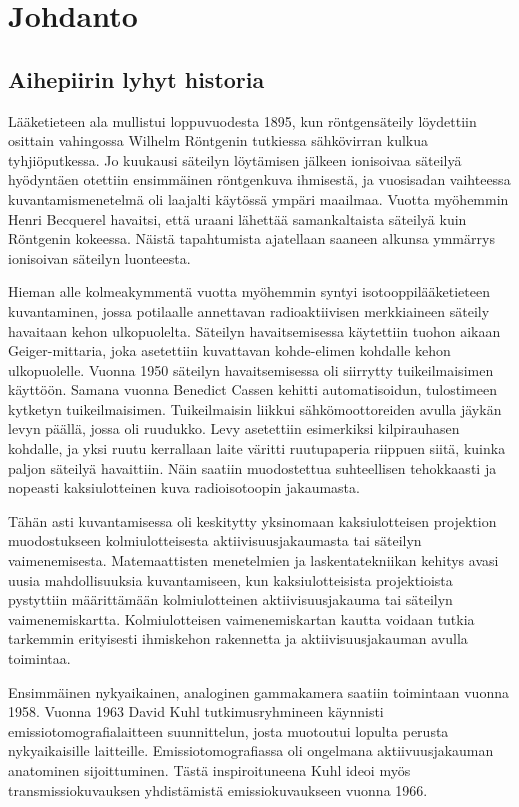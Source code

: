 \section{Johdanto}
\subsection{Aihepiirin lyhyt historia}
Lääketieteen ala mullistui loppuvuodesta 1895, kun röntgensäteily löydettiin osittain vahingossa Wilhelm Röntgenin tutkiessa sähkövirran kulkua tyhjiöputkessa. Jo kuukausi säteilyn löytämisen jälkeen ionisoivaa säteilyä hyödyntäen otettiin ensimmäinen röntgenkuva ihmisestä, ja vuosisadan vaihteessa kuvantamismenetelmä oli laajalti käytössä ympäri maailmaa.\cite{bercovich_medical_2018, cherry_basic_2012} Vuotta myöhemmin Henri Becquerel havaitsi, että uraani lähettää samankaltaista säteilyä kuin Röntgenin kokeessa. Näistä tapahtumista ajatellaan saaneen alkunsa ymmärrys ionisoivan säteilyn luonteesta.\cite{cherry_basic_2012}

Hieman alle kolmeakymmentä vuotta myöhemmin syntyi isotooppilääketieteen kuvantaminen, jossa potilaalle annettavan radioaktiivisen merkkiaineen säteily havaitaan kehon ulkopuolelta. Säteilyn havaitsemisessa käytettiin tuohon aikaan Geiger-mittaria, joka asetettiin kuvattavan kohde-elimen kohdalle kehon ulkopuolelle. Vuonna 1950 säteilyn havaitsemisessa oli siirrytty tuikeilmaisimen käyttöön. Samana vuonna Benedict Cassen kehitti automatisoidun, tulostimeen kytketyn tuikeilmaisimen. Tuikeilmaisin liikkui sähkömoottoreiden avulla jäykän levyn päällä, jossa oli ruudukko. Levy asetettiin esimerkiksi kilpirauhasen kohdalle, ja yksi ruutu kerrallaan laite väritti ruutupaperia riippuen siitä, kuinka paljon säteilyä havaittiin. Näin saatiin muodostettua suhteellisen tehokkaasti ja nopeasti kaksiulotteinen kuva radioisotoopin jakaumasta.\cite{jaszczak_early_2006}

Tähän asti kuvantamisessa oli keskitytty yksinomaan kaksiulotteisen projektion muodostukseen kolmiulotteisesta aktiivisuusjakaumasta tai säteilyn vaimenemisesta. Matemaattisten menetelmien ja laskentatekniikan kehitys avasi uusia mahdollisuuksia kuvantamiseen, kun kaksiulotteisista projektioista pystyttiin määrittämään kolmiulotteinen aktiivisuusjakauma tai säteilyn vaimenemiskartta. Kolmiulotteisen vaimenemiskartan kautta voidaan tutkia tarkemmin erityisesti ihmiskehon rakennetta ja aktiivisuusjakauman avulla toimintaa.

Ensimmäinen nykyaikainen, analoginen gammakamera saatiin toimintaan vuonna 1958\cite{hutton_origins_2014}. Vuonna 1963 David Kuhl tutkimusryhmineen käynnisti emissiotomografialaitteen suunnittelun, josta muotoutui lopulta perusta nykyaikaisille laitteille\cite{jaszczak_early_2006, hutton_origins_2014}. Emissiotomografiassa oli ongelmana aktiivuusjakauman anatominen sijoittuminen. Tästä inspiroituneena Kuhl ideoi myös transmissiokuvauksen yhdistämistä emissiokuvaukseen vuonna 1966\cite{jaszczak_early_2006}.

